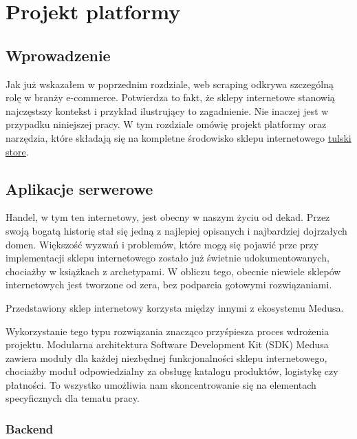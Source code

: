 \newpage


\section{Projekt platformy}

\subsection{Wprowadzenie}

Jak już wskazałem w poprzednim rozdziale, web scraping odkrywa szczególną rolę w branży e-commerce.
Potwierdza to fakt, że sklepy internetowe stanowią najczęstszy kontekst i przykład ilustrujący to zagadnienie.
Nie inaczej jest w przypadku niniejszej pracy.
W tym rozdziale omówię projekt platformy oraz narzędzia, które składają się na kompletne środowisko sklepu internetowego \href{https://store.tulski.com}{tulski store}.

\subsection{Aplikacje serwerowe}

Handel, w tym ten internetowy, jest obecny w naszym życiu od dekad.
Przez swoją bogatą historię stał się jedną z najlepiej opisanych i najbardziej dojrzałych domen.
Większość wyzwań i problemów, które mogą się pojawić prze przy implementacji sklepu internetowego zostało już świetnie udokumentowanych, chociażby w książkach z archetypami.
W obliczu tego, obecnie niewiele sklepów internetowych jest tworzone od zera, bez podparcia gotowymi rozwiązaniami.

Przedstawiony sklep internetowy korzysta między innymi z ekosystemu Medusa.


Wykorzystanie tego typu rozwiązania znacząco przyśpiesza proces wdrożenia projektu.
Modularna architektura Software Development Kit (SDK) Medusa zawiera moduły dla każdej niezbędnej funkcjonalności sklepu internetowego, chociażby moduł odpowiedzialny za obsługę katalogu produktów, logistykę czy płatności.
To wszystko umożliwia nam skoncentrowanie się na elementach specyficznych dla tematu pracy.

\subsubsection{Backend}

